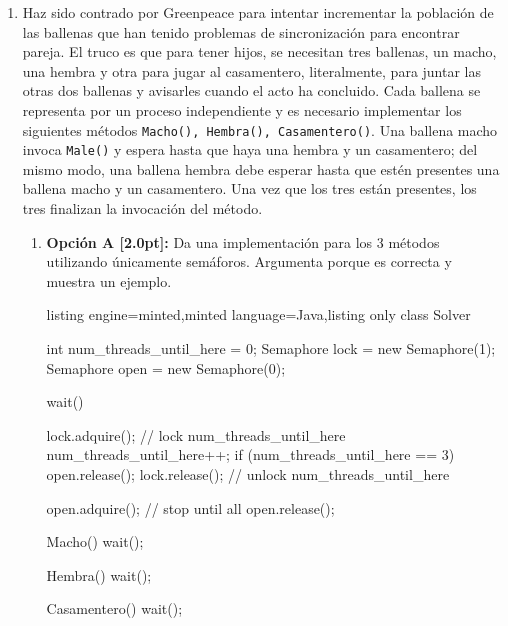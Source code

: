 \documentclass[a4paper,11pt]{article}
\begin{document}
\begin{enumerate}
        \item{Haz sido contrado por Greenpeace para intentar incrementar la población de las 
        ballenas que han tenido problemas de sincronización para encontrar pareja. 
        El truco es que para tener hijos, se necesitan tres ballenas, un macho, una hembra
         y otra para jugar al casamentero, literalmente, para juntar las otras dos ballenas 
         y avisarles cuando el acto ha concluido. Cada ballena se representa por un proceso 
         independiente y es necesario implementar los siguientes métodos \verb|Macho(), Hembra(), Casamentero()|. 
         Una ballena macho invoca \verb|Male()| y espera hasta que haya una hembra y un casamentero; del 
         mismo modo, una ballena hembra debe esperar hasta que estén presentes una ballena macho y un
          casamentero. Una vez que los tres están presentes, los tres finalizan la invocación del método. 
            \begin{enumerate}
                \item 
                    \textbf{Opción A [2.0pt]:} Da una implementación para los 3 métodos 
                    utilizando únicamente semáforos. Argumenta porque es correcta y muestra un ejemplo.

                    \begin{tcblisting}{listing engine=minted,minted language=Java,listing only}
                        class Solver {
                            int num_threads_until_here = 0;
                            Semaphore lock = new Semaphore(1); 
                            Semaphore open = new Semaphore(0); 
                        
                            wait() {
                                lock.adquire(); // lock num_threads_until_here
                                    num_threads_until_here++;
                                    if (num_threads_until_here == 3) open.release();
                                lock.release(); // unlock num_threads_until_here

                                open.adquire(); // stop until all
                                open.release();
                            }

                            Macho() {
                                wait();
                            }

                            Hembra() {
                                wait();
                            }

                            Casamentero() {
                                wait();
                            }
                        }
                    \end{tcblisting}


\end{enumerate}}
\end{enumerate}
\end{document}
